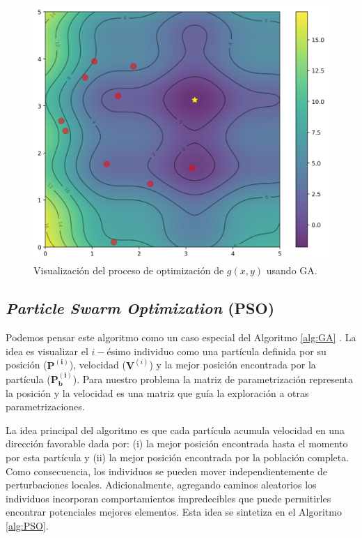 \begin{figure}[ht]
  \centering
  \includegraphics[scale=0.5]{image/theory/GA.png}
   \caption{Visualización del proceso de optimización de $g(x, y)$ usando GA.}
  \label{fig:ga}
\end{figure}


\subsection{\emph{Particle Swarm Optimization} (PSO)}\label{sec:pso}

Podemos pensar este algoritmo como un caso especial del Algoritmo \ref{alg:GA}
\citep{Mykel2019}.
La idea es visualizar el $i-$ésimo individuo como una partícula definida por 
su posición ($\boldsymbol{P^{(i)}}$), velocidad ($\boldsymbol{V}^{(i)}$) y 
la mejor posición encontrada por la partícula ($\boldsymbol{P^{(i)}_b}$).
Para nuestro problema la matriz de parametrización representa la posición y
la velocidad es una matriz que guía la exploración a otras parametrizaciones.

La idea principal del algoritmo es que cada partícula acumula 
velocidad en una dirección favorable dada por: 
(i) la mejor posición encontrada hasta el momento por esta partícula y 
(ii) la mejor posición encontrada por la población completa.
Como consecuencia, los individuos se pueden mover independientemente de
perturbaciones locales.
Adicionalmente, agregando caminos aleatorios los individuos incorporan
comportamientos impredecibles que puede permitirles encontrar potenciales
mejores elementos. Esta idea se sintetiza en el Algoritmo \ref{alg:PSO}.

